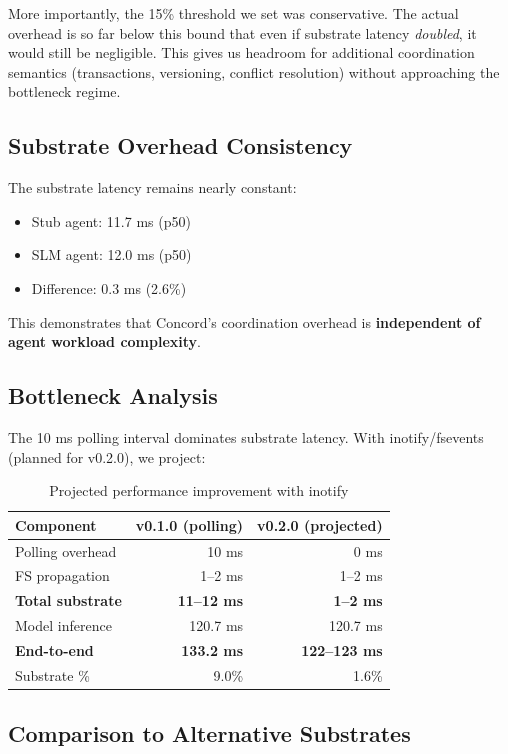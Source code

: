 \documentclass[11pt]{article}
\begin{document}
More importantly, the 15\% threshold we set was conservative. The actual overhead is so far below this bound that even if substrate latency \emph{doubled}, it would still be negligible. This gives us headroom for additional coordination semantics (transactions, versioning, conflict resolution) without approaching the bottleneck regime.

\subsection{Substrate Overhead Consistency}

The substrate latency remains nearly constant:
\begin{itemize}
\item Stub agent: 11.7 ms (p50)
\item SLM agent: 12.0 ms (p50)
\item Difference: 0.3 ms (2.6\%)
\end{itemize}

This demonstrates that Concord's coordination overhead is \textbf{independent of agent workload complexity}.

\subsection{Bottleneck Analysis}

The 10 ms polling interval dominates substrate latency. With inotify/fsevents (planned for v0.2.0), we project:

\begin{table}[h]
\centering
\begin{tabular}{lrr}
\toprule
\textbf{Component} & \textbf{v0.1.0 (polling)} & \textbf{v0.2.0 (projected)} \\
\midrule
Polling overhead & 10 ms & 0 ms \\
FS propagation & 1--2 ms & 1--2 ms \\
\textbf{Total substrate} & \textbf{11--12 ms} & \textbf{1--2 ms} \\
\midrule
Model inference & 120.7 ms & 120.7 ms \\
\textbf{End-to-end} & \textbf{133.2 ms} & \textbf{122--123 ms} \\
\midrule
Substrate \% & 9.0\% & 1.6\% \\
\bottomrule
\end{tabular}
\caption{Projected performance improvement with inotify}
\end{table}

\subsection{Comparison to Alternative Substrates}
\end{document}
